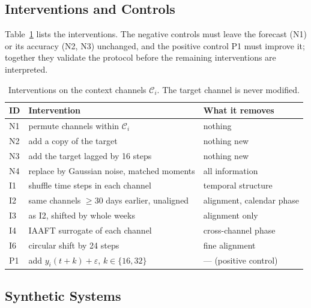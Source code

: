 \documentclass[runningheads]{llncs}
\newif\ifshowtodos
\newcommand{\todo}[1]{\ifshowtodos\textcolor{red}{[TODO: #1]}\fi}
\begin{document}
\subsection{Interventions and Controls}
Table~\ref{tab:interventions} lists the interventions. The negative controls
must leave the forecast (N1) or its accuracy (N2, N3) unchanged, and the
positive control P1 must improve it; together they validate the protocol
before the remaining interventions are interpreted.

\begin{table}[t]
  \centering
  \caption{Interventions on the context channels $\mathcal{C}_i$. The target
  channel is never modified.}
  \label{tab:interventions}
  \setlength{\tabcolsep}{4pt}
  \begin{tabular}{@{}lll@{}}
    \toprule
    ID & Intervention & What it removes \\
    \midrule
    N1 & permute channels within $\mathcal{C}_i$ & nothing \\
    N2 & add a copy of the target               & nothing new \\
    N3 & add the target lagged by 16 steps      & nothing new \\
    N4 & replace by Gaussian noise, matched moments & all information \\
    I1 & shuffle time steps in each channel & temporal structure \\
    I2 & same channels $\geq$30 days earlier, unaligned & alignment, calendar phase \\
    I3 & as I2, shifted by whole weeks & alignment only \\
    I4 & IAAFT surrogate of each channel & cross-channel phase \\
    I6 & circular shift by 24 steps              & fine alignment \\
    P1 & add $y_i(t+k)+\varepsilon$, $k\in\{16,32\}$ & --- (positive control) \\
    \bottomrule
  \end{tabular}
\end{table}

\subsection{Synthetic Systems}
\todo{Define the generators (low-rank factor, local blocks, structural drift,
lead--lag, independent channels) and the Kalman oracles after the oracle has
passed its unit tests (multivariate oracle error $\leq$ univariate oracle
error; empirical error matches the Riccati steady state).}
\end{document}
